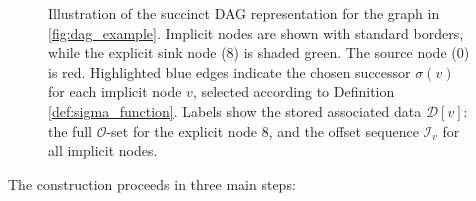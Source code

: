 \begin{figure}[htbp]
    \caption{Illustration of the succinct DAG representation for the graph in \autoref{fig:dag_example}. Implicit nodes are shown with standard borders, while the explicit sink node (8) is shaded green. The source node (0) is red. Highlighted blue edges indicate the chosen successor $\sigma(v)$ for each implicit node $v$, selected according to Definition \ref{def:sigma_function}. Labels show the stored associated data $\mathcal{D}[v]$: the full $\mathcal{O}$-set for the explicit node 8, and the offset sequence $\mathcal{I}_v$ for all implicit nodes.}
    \label{fig:succinct_dag_example}
\end{figure}

The construction proceeds in three main steps:

